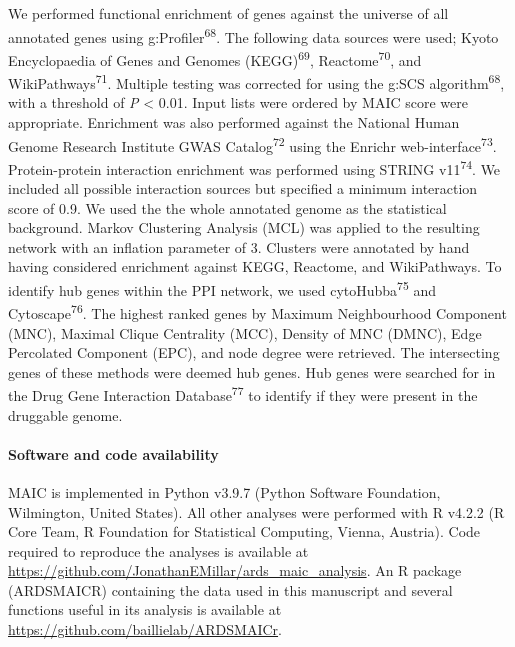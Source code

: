 \documentclass[
  11,
  a4paper,
]{article}
\let\oldparagraph\paragraph
\renewcommand{\paragraph}[1]{\oldparagraph{#1}\mbox{}}
\begin{document}
We performed functional enrichment of genes against the universe of all
annotated genes using g:Profiler\textsuperscript{68}. The following data
sources were used; Kyoto Encyclopaedia of Genes and Genomes
(KEGG)\textsuperscript{69}, Reactome\textsuperscript{70}, and
WikiPathways\textsuperscript{71}. Multiple testing was corrected for
using the g:SCS algorithm\textsuperscript{68}, with a threshold of
\emph{P} \textless{} 0.01. Input lists were ordered by MAIC score were
appropriate. Enrichment was also performed against the National Human
Genome Research Institute GWAS Catalog\textsuperscript{72} using the
Enrichr web-interface\textsuperscript{73}. Protein-protein interaction
enrichment was performed using STRING v11\textsuperscript{74}. We
included all possible interaction sources but specified a minimum
interaction score of 0.9. We used the the whole annotated genome as the
statistical background. Markov Clustering Analysis (MCL) was applied to
the resulting network with an inflation parameter of 3. Clusters were
annotated by hand having considered enrichment against KEGG, Reactome,
and WikiPathways. To identify hub genes within the PPI network, we used
cytoHubba\textsuperscript{75} and Cytoscape\textsuperscript{76}. The
highest ranked genes by Maximum Neighbourhood Component (MNC), Maximal
Clique Centrality (MCC), Density of MNC (DMNC), Edge Percolated
Component (EPC), and node degree were retrieved. The intersecting genes
of these methods were deemed hub genes. Hub genes were searched for in
the Drug Gene Interaction Database\textsuperscript{77} to identify if
they were present in the druggable genome.

\hypertarget{software-and-code-availability}{%
\paragraph{Software and code
availability}\label{software-and-code-availability}}

MAIC is implemented in Python v3.9.7 (Python Software Foundation,
Wilmington, United States). All other analyses were performed with R
v4.2.2 (R Core Team, R Foundation for Statistical Computing, Vienna,
Austria). Code required to reproduce the analyses is available at
\url{https://github.com/JonathanEMillar/ards_maic_analysis}. An R
package (ARDSMAICR) containing the data used in this manuscript and
several functions useful in its analysis is available at
\url{https://github.com/baillielab/ARDSMAICr}.

\newpage
\end{document}
